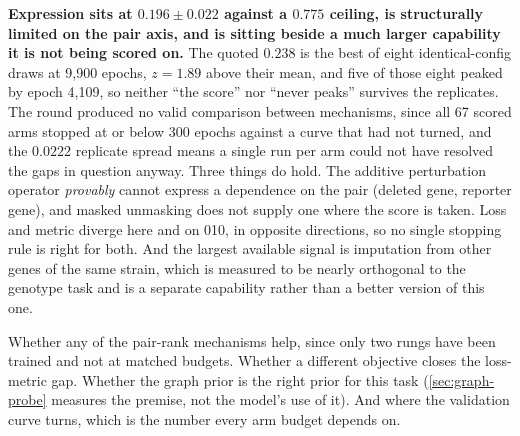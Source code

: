 \begin{keybox}
\textbf{Expression sits at $0.196 \pm 0.022$ against a $0.775$ ceiling, is structurally
limited on the pair axis, and is sitting beside a much larger capability it is not being
scored on.} The quoted $0.238$ is the best of eight identical-config draws at 9,900 epochs,
$z = 1.89$ above their mean, and five of those eight peaked by epoch 4,109, so neither
``the score'' nor ``never peaks'' survives the replicates. The round produced no valid
comparison between mechanisms, since all 67 scored arms stopped at or below 300 epochs
against a curve that had not turned, and the $0.0222$ replicate spread means a single run
per arm could not have resolved the gaps in question anyway. Three things do hold. The additive perturbation operator
\emph{provably} cannot express a dependence on the pair (deleted gene, reporter gene), and
masked unmasking does not supply one where the score is taken. Loss and metric diverge here
and on 010, in opposite directions, so no single stopping rule is right for both. And the
largest available signal is imputation from other genes of the same strain, which is
measured to be nearly orthogonal to the genotype task and is a separate capability rather
than a better version of this one.
\end{keybox}

 Whether any of the pair-rank mechanisms help, since only two rungs have
been trained and not at matched budgets. Whether a different objective closes the
loss-metric gap. Whether the graph prior is the right prior for this task
(\cref{sec:graph-probe} measures the premise, not the model's use of it). And where the
validation curve turns, which is the number every arm budget depends on.
